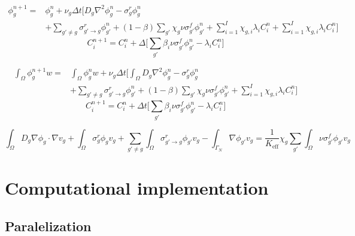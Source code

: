 \begin{equation}
   \begin{split} 
       \phi_{g}^{n+1}  = & 
       \phi_{g}^{n}           
        + \nu_{g}\Delta t 
       \bigg[
         D_{g} \nabla^{2}                                                      \phi_{g}^{n}  
         -\sigma_{g}^{r}                                                       \phi_{g}^{n} 
        \\
       & 
         + \sum_{g\prime\neq g} \sigma_{g'\rightarrow g }^{r}                  \phi_{g\prime}^{n} 
         + (1-\beta)\sum_{g\prime} \chi_{g}\nu\sigma_{g'}^{f}                  \phi_{g\prime}^{n}   
         + \sum_{i=1}^{I} \chi_{g,i}\lambda_{i} C_{i}^{n}
         + \sum_{i=1}^{I} \chi_{g,i}\lambda_{i} C_{i}^{n}
       \bigg]
   \end{split} 
\end{equation}
\begin{equation}
C_{i}^{n+1} = C_{i}^{n} + \Delta \bigg[ \sum_{g\prime}\beta_{i} \nu \sigma_{g'}^{f} \phi_{g\prime}^{n} - \lambda_{i} C_{i}^{n} \bigg]
\end{equation}

\begin{equation}
   \begin{split} 
       \int_{\Omega} \phi_{g}^{n+1} w  = & 
       \int_{\Omega} \phi_{g}^{n}   w           
        + \nu_{g}\Delta t 
       \bigg[
         \int_{\Omega} D_{g} \nabla^{2}                                        \phi_{g}^{n}  
         -\sigma_{g}^{r}                                                       \phi_{g}^{n} 
        \\
       & 
         + \sum_{g\prime\neq g} \sigma_{g'\rightarrow g }^{r}                  \phi_{g\prime}^{n} 
         + (1-\beta)\sum_{g\prime} \chi_{g}\nu\sigma_{g'}^{f}                  \phi_{g\prime}^{n}   
         + \sum_{i=1}^{I} \chi_{g,i}\lambda_{i} C_{i}^{n}
       \bigg] 
   \end{split} 
\end{equation}
\begin{equation}
C_{i}^{n+1} = C_{i}^{n} + \Delta t \bigg[ \sum_{g\prime}\beta_{i} \nu \sigma_{g'}^{f} \phi_{g\prime}^{n} - \lambda_{i} C_{i}^{n} \bigg]
\end{equation}


\begin{equation}
\int_{\Omega} D_{g} \nabla                                                       \phi_{g}\cdot \nabla v_{g} +
\int_{\Omega}\sigma_{g}^{r}                                                      \phi_{g}             v_{g} +
\sum_{g\prime\neq g} \int_{\Omega}\sigma_{g'\rightarrow g }^{r}                  \phi_{g\prime}       v_{g} -
\int_{\Gamma_{N}}\nabla                                                          \phi_{g\prime}       v_{g} =                          
\frac{1}{K_{\text{eff}}} \chi_{g}\sum_{g\prime} \int_{\Omega} \nu\sigma_{g'}^{f} \phi_{g\prime}       v_{g}
\end{equation}

\section{Computational implementation}

\subsection{Paralelization}
